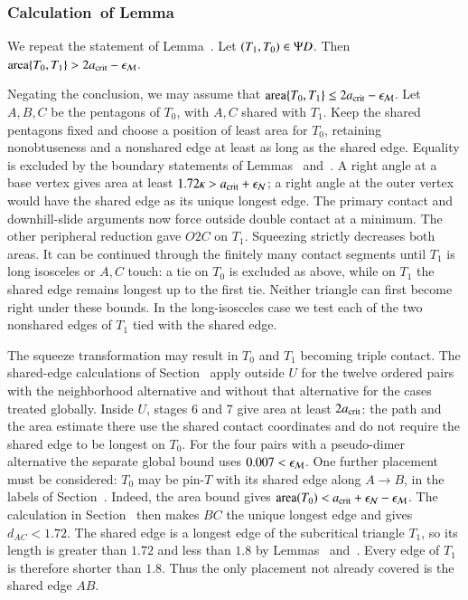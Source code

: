 \subsubsection{Calculation~of Lemma~} 

We repeat the statement of Lemma~.
Let $(T_1,T_0)\in\Psi D$.  Then ${\operatorname{area}}\{T_0,T_1\} > 2a_\text{crit} - \epsilon_{\mathcal M}$.

Negating the conclusion, we may assume that
${\operatorname{area}}\{T_0,T_1\}\le2a_\text{crit}-\epsilon_{\mathcal M}$.  Let $A,B,C$ be the pentagons of $T_0$, with $A,C$
shared with $T_1$. Keep the shared pentagons fixed and choose a
position of least area for $T_0$, retaining nonobtuseness and a
nonshared edge at least as long as the shared edge. Equality is
excluded by the boundary statements of Lemmas~
and~. A right angle at a base vertex gives area
at least $1.72\kappa>a_\text{crit}+\epsilon_{\mathcal N}$; a right angle at the outer vertex
would have the shared edge as its unique longest edge. The primary
contact and downhill-slide arguments now force outside double contact
at a minimum. The other peripheral reduction gave $O2C$ on $T_1$.
Squeezing strictly decreases both areas. It can be continued through
the finitely many contact segments until $T_1$ is long isosceles
or $A,C$ touch: a tie on $T_0$ is excluded as above, while on $T_1$
the shared edge remains longest up to the first tie. Neither triangle
can first become right under these bounds. In the long-isosceles case
we test each of the two nonshared edges of $T_1$ tied with the shared edge.

The squeeze transformation may result in $T_0$ and $T_1$ becoming
triple contact. The shared-edge calculations of Section~
apply outside $U$ for the twelve ordered pairs with the neighborhood
alternative and without that alternative for the cases treated globally.
Inside $U$, stages 6 and 7 give area at least $2a_\text{crit}$: the path and
the area estimate there use the shared contact coordinates and do not
require the shared edge to be longest on $T_0$. For the four pairs with
a pseudo-dimer alternative the separate global bound uses $0.007<\epsilon_{\mathcal M}$.
One further placement must be considered: $T_0$ may be pin-$T$
with its shared edge along $A\to B$, in the labels of
Section~. Indeed, the area bound gives
${\operatorname{area}}(T_0)<a_\text{crit}+\epsilon_{\mathcal N}-\epsilon_{\mathcal M}$.
The calculation in Section~ then makes $BC$
the unique longest edge and gives $d_{AC}<1.72$.
The shared edge is a longest edge of the subcritical triangle
$T_1$, so its length is greater than $1.72$ and less than $1.8$
by Lemmas~ and~.
Every edge of $T_1$ is therefore shorter than $1.8$.
Thus the only placement not already covered is the shared edge $AB$.


